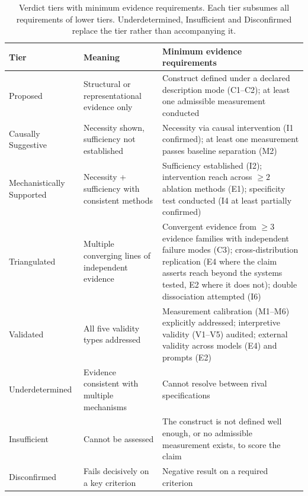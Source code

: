 \documentclass{article}
\newcommand{\tighttable}{\setlength{\tabcolsep}{4pt}\renewcommand{\arraystretch}{1.05}}
\begin{document}
\begin{table}[tbp]
\centering
\footnotesize
\tighttable
\caption{Verdict tiers with minimum evidence requirements. Each tier subsumes all requirements of lower tiers. Underdetermined, Insufficient and Disconfirmed replace the tier rather than accompanying it.}
\label{tab:verdicts}
\begin{tabular}{@{}>{\raggedright\arraybackslash}p{2.1cm}>{\raggedright\arraybackslash}p{3.2cm}>{\raggedright\arraybackslash}p{6.9cm}@{}}
\toprule
\textbf{Tier} & \textbf{Meaning} & \textbf{Minimum evidence requirements} \\
\midrule
Proposed & Structural or representational evidence only & Construct defined under a declared description mode (C1--C2); at least one admissible measurement conducted \\
\midrule
Causally Suggestive & Necessity shown, sufficiency not established & Necessity via causal intervention (I1 confirmed); at least one measurement passes baseline separation (M2) \\
\midrule
Mechanistically Supported & Necessity + sufficiency with consistent methods & Sufficiency established (I2); intervention reach across $\geq 2$ ablation methods (E1); specificity test conducted (I4 at least partially confirmed) \\
\midrule
Triangulated & Multiple converging lines of independent evidence & Convergent evidence from $\geq 3$ evidence families with independent failure modes (C3); cross-distribution replication (E4 where the claim asserts reach beyond the systems tested, E2 where it does not); double dissociation attempted (I6) \\
\midrule
Validated & All five validity types addressed & Measurement calibration (M1--M6) explicitly addressed; interpretive validity (V1--V5) audited; external validity across models (E4) and prompts (E2) \\
\midrule
Underdetermined & Evidence consistent with multiple mechanisms & Cannot resolve between rival specifications \\
\midrule
Insufficient & Cannot be assessed & The construct is not defined well enough, or no admissible measurement exists, to score the claim \\
\midrule
Disconfirmed & Fails decisively on a key criterion & Negative result on a required criterion \\
\bottomrule
\end{tabular}
\end{table}
\end{document}

